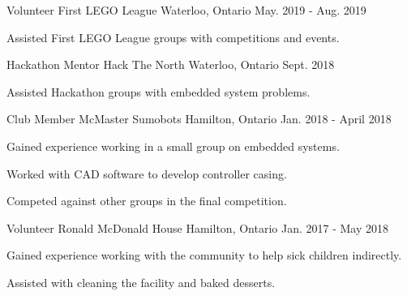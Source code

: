 
\begin{cventries}

  \cventry
    {Volunteer} %
    {First LEGO League} %
    {Waterloo, Ontario} %
    {May. 2019 - Aug. 2019} %
    {
      \begin{cvitems} %
        \item {Assisted First LEGO League groups with competitions and events.}
      \end{cvitems}
    }

  \cventry
    {Hackathon Mentor} %
    {Hack The North} %
    {Waterloo, Ontario} %
    {Sept. 2018} %
    {
      \begin{cvitems} %
        \item {Assisted Hackathon groups with embedded system problems.}
      \end{cvitems}
    }

  \cventry
    {Club Member} %
    {McMaster Sumobots} %
    {Hamilton, Ontario} %
    {Jan. 2018 - April 2018} %
    {
      \begin{cvitems} %
        \item {Gained experience working in a small group on embedded systems.}
        \item {Worked with CAD software to develop controller casing.}
        \item {Competed against other groups in the final competition.}
      \end{cvitems}
    }
    
  \cventry
    {Volunteer} %
    {Ronald McDonald House} %
    {Hamilton, Ontario} %
    {Jan. 2017 - May 2018} %
    {
      \begin{cvitems} %
        \item {Gained experience working with the community to help sick children indirectly.}
        \item {Assisted with cleaning the facility and baked desserts.}
      \end{cvitems}
    }


\end{cventries}
